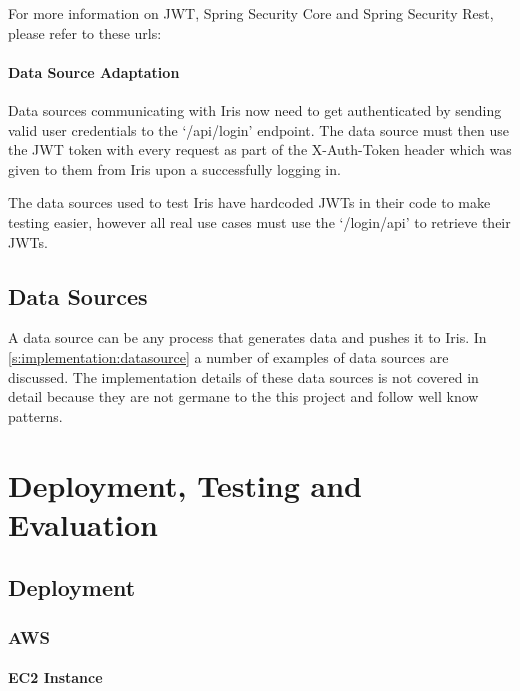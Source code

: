 \documentclass[12pt,a4paper,titlepage]{report}
\begin{document}
For more information on JWT, Spring Security Core and Spring Security Rest, please refer to these urls:


\subsubsection{Data Source Adaptation}
Data sources communicating with Iris now need to get authenticated by sending valid user credentials to the `/api/login' endpoint. The data source must then use the JWT token with every request as part of the X-Auth-Token header which was given to them from Iris upon a successfully logging in.

The data sources used to test Iris have hardcoded JWTs in their code to make testing easier, however all real use cases must use the `/login/api' to retrieve their JWTs.

\section{Data Sources}
A data source can be any process that generates data and pushes it to Iris. In \cref{s:implementation:datasource}
a number of examples of data sources are discussed. The implementation details of these data sources is not covered in detail because they are not germane to the this project and follow well know patterns.

\chapter{Deployment, Testing and Evaluation}

\section{Deployment}
\subsection{AWS}
\subsubsection{EC2 Instance}
\end{document}
